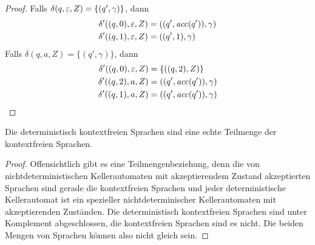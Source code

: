 {\begin{proof}
  Falls $\delta(q,\varepsilon,Z) = \{(q',\gamma)\}$, dann
  \begin{align*}
    \delta'((q,0),\varepsilon,Z) &= ((q',\mathit{acc} (q')),\gamma)
    \\
    \delta'((q,1),\varepsilon,Z) &= ((q',1),\gamma)
  \end{align*}
  Falls $\delta(q,a,Z) = \{(q',\gamma)\}$, dann
  \begin{align*}
    \delta'((q,0), \Eps, Z) &= \{ ((q,2), Z) \} \\
    \delta'((q,2), a, Z) &=((q',\mathit{acc} (q')), \gamma)
    \\
    \delta'((q,1), a, Z) &=
    ((q',\mathit{acc} (q')), \gamma)
    \qedhere    %
  \end{align*}
\end{proof}

\begin{Satz}
Die deterministisch kontextfreien Sprachen sind eine echte Teilmenge der kontextfreien Sprachen.
\end{Satz}

\begin{proof}
 Offensichtlich gibt es eine Teilmengenbeziehung, denn die von nichtdeterministischen Kellerautomaten mit akzeptierendem Zustand akzeptierten Sprachen sind gerade die kontextfreien Sprachen und jeder deterministische Kellerautomat ist ein spezieller nichtdeterminischer Kellerautomaten mit akzeptierenden Zuständen.
 Die deterministisch kontextfreien Sprachen sind unter Komplement abgeschlossen, die kontextfreien Sprachen sind es nicht.
 Die beiden Mengen von Sprachen können also nicht gleich sein.
\end{proof}



}
